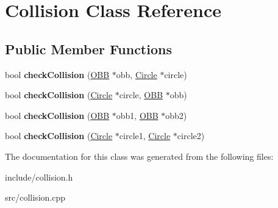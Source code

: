 \hypertarget{class_collision}{}\section{Collision Class Reference}
\label{class_collision}
\subsection*{Public Member Functions}
\begin{DoxyCompactItemize}
\item 
\hypertarget{class_collision_a44e79bda5f44c7a94018c09f85c8cd3e}{}bool {\bfseries check\+Collision} (\hyperlink{class_o_b_b}{O\+B\+B} $\ast$obb, \hyperlink{class_circle}{Circle} $\ast$circle)\label{class_collision_a44e79bda5f44c7a94018c09f85c8cd3e}

\item 
\hypertarget{class_collision_a76e704409a75244c07b5431dafcfe18f}{}bool {\bfseries check\+Collision} (\hyperlink{class_circle}{Circle} $\ast$circle, \hyperlink{class_o_b_b}{O\+B\+B} $\ast$obb)\label{class_collision_a76e704409a75244c07b5431dafcfe18f}

\item 
\hypertarget{class_collision_a8fcea4d350d740f1578c55cff95ba08f}{}bool {\bfseries check\+Collision} (\hyperlink{class_o_b_b}{O\+B\+B} $\ast$obb1, \hyperlink{class_o_b_b}{O\+B\+B} $\ast$obb2)\label{class_collision_a8fcea4d350d740f1578c55cff95ba08f}

\item 
\hypertarget{class_collision_af8ad2b58b11228c3b654da2a42f1f484}{}bool {\bfseries check\+Collision} (\hyperlink{class_circle}{Circle} $\ast$circle1, \hyperlink{class_circle}{Circle} $\ast$circle2)\label{class_collision_af8ad2b58b11228c3b654da2a42f1f484}

\end{DoxyCompactItemize}


The documentation for this class was generated from the following files\+:\begin{DoxyCompactItemize}
\item 
include/collision.\+h\item 
src/collision.\+cpp\end{DoxyCompactItemize}
